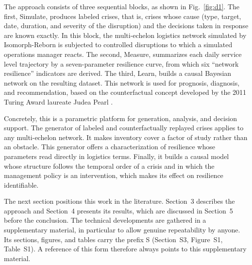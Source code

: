 The approach consists of three sequential blocks, as shown in Fig.~\ref{fig:d1}. The first, Simulate, produces labeled crises, that is, crises whose cause (type, target, date, duration, and severity of the disruption) and the decisions taken in response are known exactly. In this block, the multi-echelon logistics network simulated by Isomorph-Reborn is subjected to controlled disruptions to which a simulated operations manager reacts. The second, Measure, summarizes each daily service level trajectory by a seven-parameter resilience curve, from which six ``network resilience'' indicators are derived. The third, Learn, builds a causal Bayesian network on the resulting dataset. This network is used for prognosis, diagnosis, and recommendation, based on the counterfactual concept developed by the 2011 Turing Award laureate Judea Pearl \citep{pearl2009}.

\begin{center}
\resizebox{0.88\textwidth}{!}{}
\label{fig:d1}
\end{center}

Concretely, this is a parametric platform for generation, analysis, and decision support. The generator of labeled and counterfactually replayed crises applies to any multi-echelon network. It makes inventory cover a factor of study rather than an obstacle. This generator offers a characterization of resilience whose parameters read directly in logistics terms. Finally, it builds a causal model whose structure follows the temporal order of a crisis and in which the management policy is an intervention, which makes its effect on resilience identifiable.

The next section positions this work in the literature. Section~3 describes the approach and Section~4 presents its results, which are discussed in Section~5 before the conclusion. The technical developments are gathered in a supplementary material, in particular to allow genuine repeatability by anyone. Its sections, figures, and tables carry the prefix S (Section~S3, Figure~S1, Table~S1). A reference of this form therefore always points to this supplementary material.
